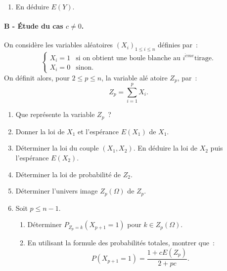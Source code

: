 \documentclass[a4paper, 11pt,reqno]{article}
\begin{document}
\begin{exercice}
\begin{enumerate}
\item En d\'{e}duire $E(Y)$.
\end{enumerate}

\paragraph{\small{B - \'Etude du cas $c\neq 0$.}\\}

On consid\`{e}re les variables al\'{e}atoires $\left( X_{i}\right)
_{1\leqslant i\leqslant n}$ d\'{e}finies par~: 
\begin{equation*}
\begin{cases}
X_{i}=1 & \text{si on obtient une boule blanche au }i^{\grave{e}me}\text{
tirage.} \\ 
X_{i}=0 & \text{sinon.}%
\end{cases}%
\end{equation*}%
On d\'{e}finit alors, pour $2\leqslant p\leqslant n$, la variable al\'{e}%
atoire $Z_{p}$, par~: 
\begin{equation*}
Z_{p}=\sum_{i=1}^{p}X_{i}.
\end{equation*}

\begin{enumerate}
\item Que repr\'{e}sente la variable $Z_{p}$~?

\item Donner la loi de $X_{1}$ et l'esp\'{e}rance $E(X_{1})$ de $X_{1}$.

\item D\'{e}terminer la loi du couple $(X_{1},X_{2})$. En d\'{e}duire la loi
de $X_{2}$ puis l'esp\'{e}rance $E(X_{2})$.

\item D\'{e}terminer la loi de probabilit\'{e} de $Z_{2}$.

\item D\'{e}terminer l'univers image $Z_{p}\left( \Omega \right) $ de $Z_{p} 
$.

\item Soit $p\leqslant n-1$.

\begin{enumerate}
\item D\'{e}terminer $P_{Z_{p}=k}(X_{p+1}=1)$ pour $k\in Z_{p}\left( \Omega
\right) $.

\item En utilisant la formule des probabilit\'{e}s totales, montrer que~: 
\begin{equation*}
P(X_{p+1}=1)=\frac{1+cE(Z_{p})}{2+pc}.
\end{equation*}


\end{enumerate}
\end{enumerate}
\end{exercice}
\end{document}
